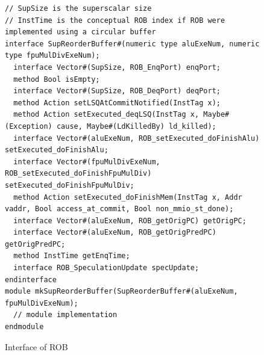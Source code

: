 \begin{figure}[!htb]
\begin{lstlisting}[caption={}]
// SupSize is the superscalar size
// InstTime is the conceptual ROB index if ROB were implemented using a circular buffer
interface SupReorderBuffer#(numeric type aluExeNum, numeric type fpuMulDivExeNum);
  interface Vector#(SupSize, ROB_EnqPort) enqPort;
  method Bool isEmpty;
  interface Vector#(SupSize, ROB_DeqPort) deqPort;
  method Action setLSQAtCommitNotified(InstTag x);
  method Action setExecuted_deqLSQ(InstTag x, Maybe#(Exception) cause, Maybe#(LdKilledBy) ld_killed);
  interface Vector#(aluExeNum, ROB_setExecuted_doFinishAlu) setExecuted_doFinishAlu;
  interface Vector#(fpuMulDivExeNum, ROB_setExecuted_doFinishFpuMulDiv) setExecuted_doFinishFpuMulDiv;
  method Action setExecuted_doFinishMem(InstTag x, Addr vaddr, Bool access_at_commit, Bool non_mmio_st_done);
  interface Vector#(aluExeNum, ROB_getOrigPC) getOrigPC;
  interface Vector#(aluExeNum, ROB_getOrigPredPC) getOrigPredPC;
  method InstTime getEnqTime;
  interface ROB_SpeculationUpdate specUpdate;
endinterface
module mkSupReorderBuffer(SupReorderBuffer#(aluExeNum, fpuMulDivExeNum);
  // module implementation
endmodule
\end{lstlisting}
\caption{Interface of ROB}\label{fig:rob-ifc}
\end{figure}

